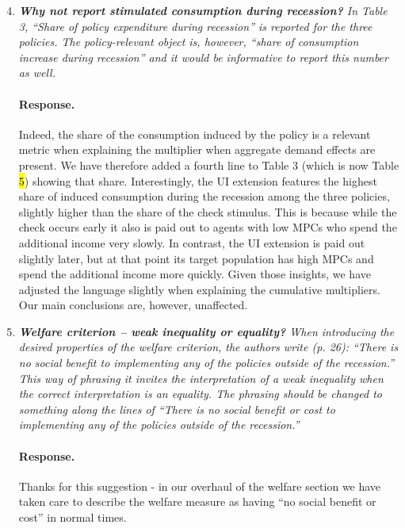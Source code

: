 \documentclass[12pt,letterpaper,english]{article}
\begin{document}
\begin{enumerate}
\setcounter{enumi}{3}
	\item \textit{\textbf{Why not report stimulated consumption during recession?} In Table 3, ``Share of policy expenditure during recession'' is reported for the three policies. The policy-relevant object is, however, ``share of consumption increase during recession'' and it would be informative to report this number as well.} 
	 
	\paragraph{Response.} Indeed, the share of the consumption induced by the policy is a relevant metric when explaining the multiplier when aggregate demand effects are present. We have therefore added a fourth line to Table 3 (which is now Table \colorbox{yellow}{5}) showing that share. Interestingly, the UI extension features the highest share of induced consumption during the recession among the three policies, slightly higher than the share of the check stimulus. This is because while the check occurs early it also is paid out to agents with low MPCs who spend the additional income very slowly. In contrast, the UI extension is paid out slightly later, but at that point  its target population has high MPCs and spend the additional income more quickly. Given those insights, we have adjusted the language slightly when explaining the cumulative multipliers. Our main conclusions are, however, unaffected.

	\item \textit{\textbf{Welfare criterion – weak inequality or equality?} When introducing the desired properties of the welfare criterion, the authors write (p. 26): ``There is no social benefit to implementing any of the policies outside of the recession.'' This way of phrasing it invites the interpretation of a weak inequality when the correct interpretation	is an equality. The phrasing should be changed to something along the	lines of ``There is no social benefit or cost to implementing any of the policies outside of the recession.''}

	\paragraph{Response.} Thanks for this suggestion - in our overhaul of the welfare section we have taken care to describe the welfare measure as having ``no social benefit or cost'' in normal times.


\end{enumerate}
\end{document}
